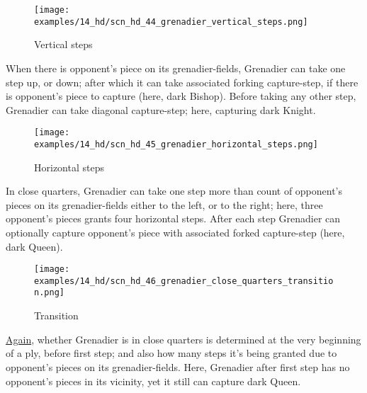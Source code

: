 \vspace*{-0.7\baselineskip}
\noindent
\begin{wrapfigure}[10]{l}{0.4\textwidth}
\centering
\texttt{[image: examples/14\_hd/scn\_hd\_44\_grenadier\_vertical\_steps.png]}
\vspace*{-0.5\baselineskip}
\caption{Vertical steps}
\label{fig:scn_hd_44_grenadier_vertical_steps}
\end{wrapfigure}
When there is opponent's piece on its grenadier-fields, Grenadier can take one step
up, or down; after which it can take associated forking capture-step, if there is
opponent's piece to capture (here, dark Bishop). Before taking any other step,
Grenadier can take diagonal capture-step; here, capturing dark Knight.

\vspace*{-0.7\baselineskip}
\noindent
\begin{figure}[!h]
\texttt{[image: examples/14\_hd/scn\_hd\_45\_grenadier\_horizontal\_steps.png]}
\vspace*{-1.4\baselineskip}
\caption{Horizontal steps}
\label{fig:scn_hd_45_grenadier_horizontal_steps}
\end{figure}

\vspace*{-0.7\baselineskip}
In close quarters, Grenadier can take one step more than count of opponent's pieces
on its grenadier-fields either to the left, or to the right; here, three opponent's
pieces grants four horizontal steps. After each step Grenadier can optionally capture
opponent's piece with associated forked capture-step (here, dark Queen).

\vspace*{-0.7\baselineskip}
\noindent
\begin{wrapfigure}[6]{l}{0.4\textwidth}
\centering
\texttt{[image: examples/14\_hd/scn\_hd\_46\_grenadier\_close\_quarters\_transition.png]}
\vspace*{-0.5\baselineskip}
\caption{Transition}
\label{fig:scn_hd_46_grenadier_close_quarters_transition}
\end{wrapfigure}
\hyperref[fig:scn_hd_42_grenadier_movement_transition]{Again},
whether Grenadier is in close quarters is determined at the very beginning of a ply,
before first step; and also how many steps it's being granted due to opponent's pieces
on its grenadier-fields. \newline
Here, Grenadier after first step has no opponent's pieces in its vicinity, yet it
still can capture dark Queen.

